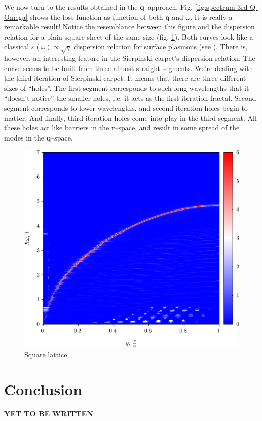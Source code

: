 \documentclass[a4paper,12pt]{article}
\begin{document}
    We now turn to the results obtained in the $\mathbf{q}$--approach. Fig. \ref{fig:spectrum-3rd-Q-Omega} shows the loss function as function of both $\mathbf{q}$ and $\omega$. It is really a remarkable result! Notice the resemblance between this figure and the dispersion relation for a plain square sheet of the same size (fig. \ref{fig:spectrum-SL-Q-Omega}). Both curves look like a classical $\varepsilon(\omega) \propto \sqrt{q}$ dispersion relation for surface plasmons (see \cite{giuliani2005quantum}). There is, however, an interesting feature in the Sierpinski carpet's dispersion relation. The curve seems to be built from three almost straight segments. We're dealing with the third iteration of Sierpinski carpet. It means that there are three different sizes of ``holes''. The first segment corresponds to such long wavelengths that it ``doesn't notice'' the smaller holes, i.e. it acts as the first iteration fractal. Second segment corresponds to lower wavelengths, and second iteration holes begin to matter. And finally, third iteration holes come into play in the third segment. All these holes act like barriers in the $\mathbf{r}$--space, and result in some spread of the modes in the $\mathbf{q}$--space.

    \begin{figure}[h]
    \center
    \includegraphics[width=\textwidth]{Spectrum-SL-Q-Omega.png}
    \caption{Square lattice}
    \label{fig:spectrum-SL-Q-Omega}
    \end{figure}

\newpage
\section{Conclusion}
    \textbf{YET TO BE WRITTEN}

\newpage

\end{document}
